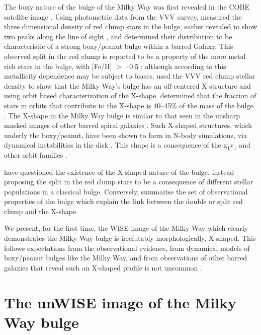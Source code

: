 \documentclass[12pt, preprint]{aastex}
\begin{document}
The boxy nature of the bulge of the Milky Way was first revealed in
the COBE satellite image \citep{Dwek1995}. Using photometric data from
the VVV survey, \citet{Wegg2013} measured the three dimensional
density of red clump stars in the bulge, earlier revealed to show two
peaks along the line of sight \citep{McWilliam2010, Nataf2010}, and
determined their distribution to be characteristic of a strong
boxy/peanut bulge within a barred Galaxy. This observed split in the
red clump is reported to be a property of the more metal rich stars in
the bulge, with [Fe/H] $>$ --0.5 \citep{Ness2012, Uttenthaler2012};
although according to \citet{Nataf2014} this metallicity dependence
may be subject to biases.  \citet{Portail2015a} used the VVV red clump
stellar density to show that the Milky Way's bulge has an off-centered
X-structure and using orbit based characterization of the
X-shape, determined that the fraction of stars in orbits that
contribute to the X-shape is 40--45\% of the mass of the bulge
\citep{Portail2015b}. The X-shape in the Milky Way bulge is similar to
that seen in the unsharp masked images of other barred spiral galaxies
\citep[e.g.][]{Bureau2006}. Such X-shaped structures, which underly
the boxy/peanut, have been shown to form in N-body simulations, via
dynamical instabilities in the disk \citep[e.g.][]{Athanassoula2005,
  Debattista2006, Inma2006}. This shape is a consequence of the
x$_{1}$v$_{1}$ \citep{P1984, Athanassoula1992} and other orbit
families \citep[e.g.][]{Portail2015b}.

\citet{Lee2015} have questioned the existence of the X-shaped nature of the bulge, instead proposing the split in the red clump stars to be a consequence of different stellar populations in a classical bulge. Conversely,  \citet{Gonzalez2015} summarise the set of observational properties of the bulge which explain the link between the double or split red clump and the X-shape.


 We present, for the first time, the WISE image of the Milky Way \citep{Lang2014a, Meisner2016} which clearly demonstrates the Milky Way bulge is irrefutably morphologically, X-shaped. This follows expectations from the observational evidence,  from dynamical models of boxy/peanut bulges like the Milky Way, and from observations of other barred galaxies that reveal such an X-shaped profile is not uncommon \citep{L2014}. 

\section{The unWISE image of the Milky Way bulge}
\end{document}
